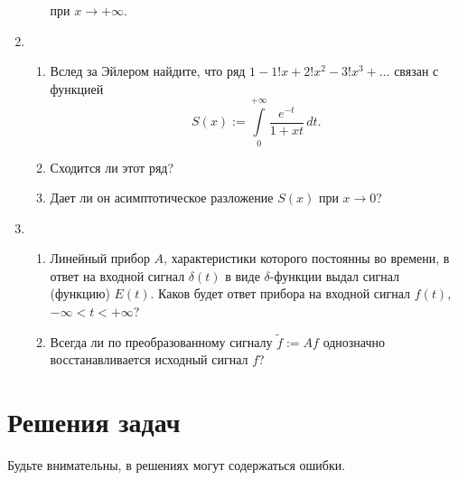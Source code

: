 \documentclass[a4paper]{article}
\begin{document}
\begin{enumerate}
\begin{enumerate}
    при $x\rightarrow +\infty$.
  \end{enumerate}
  \item \begin{enumerate}
          \item Вслед за Эйлером найдите, что ряд
          $1-1!x+2!x^2-3!x^3+\ldots$ связан с функцией
          $$S(x):=
          \int\limits_0^{+\infty}\!\frac{e^{-t}}{1+xt}\,dt.$$
          \item Сходится ли этот ряд?
          \item Дает ли он асимптотическое разложение $S(x)$ при $x\rightarrow 0$?
        \end{enumerate}
  \item \begin{enumerate}
          \item Линейный прибор $A$, характеристики которого
          постоянны во времени, в ответ на входной сигнал
          $\delta(t)$ в виде $\delta$-функции выдал сигнал (функцию)
          $E(t)$. Каков будет ответ прибора на входной сигнал
          $f(t)$, $-\infty<t<+\infty$?
          \item Всегда ли по преобразованному сигналу
          $\tilde{f}:=Af$ однозначно восстанавливается исходный
          сигнал $f$?
        \end{enumerate}
\end{enumerate}

\medskip\dmvntrail
\newpage

\section*{Решения задач}

Будьте внимательны, в решениях могут содержаться ошибки.
\end{document}
